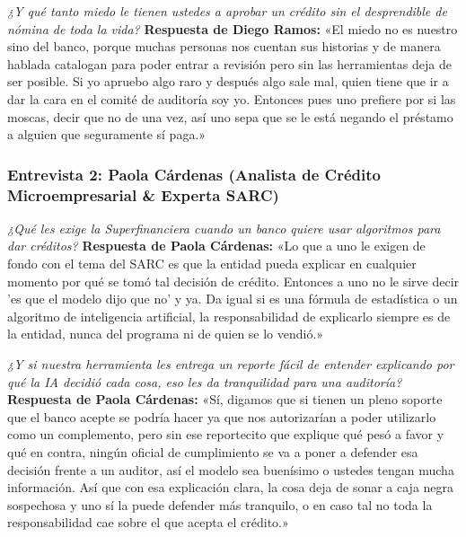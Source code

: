 \documentclass[11pt,a4paper]{article}
\begin{document}
\begin{tcolorbox}[colback=lightgray,colframe=primary,title=\textbf{Pregunta 4: Miedo a la aprobación sin desprendible de nómina}]
\textit{¿Y qué tanto miedo le tienen ustedes a aprobar un crédito sin el desprendible de nómina de toda la vida?}
\tcblower
\textbf{Respuesta de Diego Ramos:}  
«El miedo no es nuestro sino del banco, porque muchas personas nos cuentan sus historias y de manera hablada catalogan para poder entrar a revisión pero sin las herramientas deja de ser posible. Si yo apruebo algo raro y después algo sale mal, quien tiene que ir a dar la cara en el comité de auditoría soy yo. Entonces pues uno prefiere por si las moscas, decir que no de una vez, así uno sepa que se le está negando el préstamo a alguien que seguramente sí paga.»
\end{tcolorbox}

\subsubsection{Entrevista 2: Paola Cárdenas (Analista de Crédito Microempresarial \& Experta SARC)}

\begin{tcolorbox}[colback=lightgray,colframe=secondary,title=\textbf{Pregunta 5: Requerimientos de la Superintendencia Financiera (SARC)}]
\textit{¿Qué les exige la Superfinanciera cuando un banco quiere usar algoritmos para dar créditos?}
\tcblower
\textbf{Respuesta de Paola Cárdenas:}  
«Lo que a uno le exigen de fondo con el tema del SARC es que la entidad pueda explicar en cualquier momento por qué se tomó tal decisión de crédito. Entonces a uno no le sirve decir 'es que el modelo dijo que no' y ya. Da igual si es una fórmula de estadística o un algoritmo de inteligencia artificial, la responsabilidad de explicarlo siempre es de la entidad, nunca del programa ni de quien se lo vendió.»
\end{tcolorbox}

\begin{tcolorbox}[colback=lightgray,colframe=secondary,title=\textbf{Pregunta 6: Tranquilidad regulatoria con reportes de explicabilidad (XAI/SHAP)}]
\textit{¿Y si nuestra herramienta les entrega un reporte fácil de entender explicando por qué la IA decidió cada cosa, eso les da tranquilidad para una auditoría?}
\tcblower
\textbf{Respuesta de Paola Cárdenas:}  
«Sí, digamos que si tienen un pleno soporte que el banco acepte se podría hacer ya que nos autorizarían a poder utilizarlo como un complemento, pero sin ese reportecito que explique qué pesó a favor y qué en contra, ningún oficial de cumplimiento se va a poner a defender esa decisión frente a un auditor, así el modelo sea buenísimo o ustedes tengan mucha información. Así que con esa explicación clara, la cosa deja de sonar a caja negra sospechosa y uno sí la puede defender más tranquilo, o en caso tal no toda la responsabilidad cae sobre el que acepta el crédito.»
\end{tcolorbox}
\end{document}
